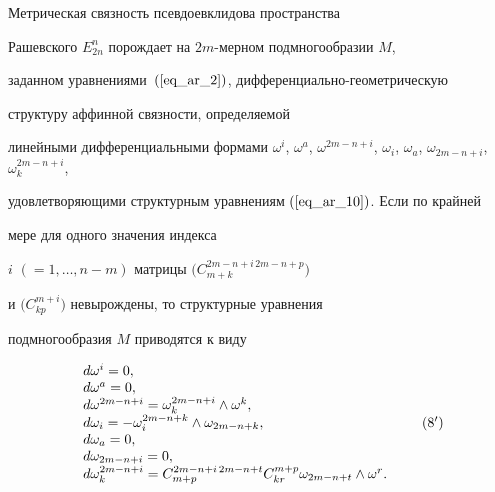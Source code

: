 \begin{thm}


Метрическая связность псевдоевклидова пространства


Рашевского $E^n_{2n}$ порождает на $2m$-мерном подмногообразии $M$,


заданном уравнениями~$(\ref{eq_ar_2})$, дифференциально-геометрическую


структуру аффинной связности, определяемой


линейными дифференциальными формами $\omega^i$, $\omega^a$, $\omega^{2m-


n+i}$, $\omega_i$, $\omega_a$, $\omega_{2m-n+i}$, $\omega^{2m-n+i}_k$,


удовлетворяющими структурным уравнениям $(\ref{eq_ar_10})$. Если по крайней


мере для одного значения индекса


$i$ $(=1, \dotsc, n - m)$ матрицы $\big(C^{2m-n+i\, 2m-n+p}_{m+k}\big)$


и $\big(C^{m+i}_{kp}\big)$ невырождены, то структурные уравнения


подмногообразия $M$ приводятся к виду


\begin{equation}




\begin{array}{l}


d\omega^i=0,\\


d\omega^a=0,\\


d\omega^{2m-n+i}=\omega^{2m-n+i}_k\wedge \omega^k,\\


d\omega_i=-\omega^{2m-n+k}_i\wedge \omega_{2m-n+k},\\


d\omega_a=0,\\


d\omega_{2m-n+i}=0,\\


d\omega^{2m-n+i}_k=C^{2m-n+i\, 2m-n+t}_{m+p}C^{m+p}_{kr}\omega_{2m-


n+t}\wedge \omega^r.


\end{array}


\tag{8${}'$}


\end{equation}


\end{thm}





